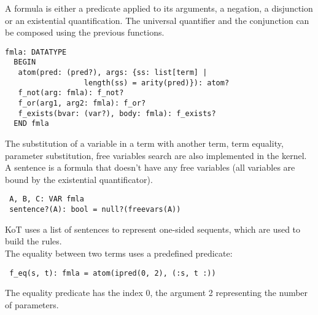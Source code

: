 \documentclass[a4paper,12pt]{article}
\begin{document}
A formula is either a predicate applied to its arguments, a negation, a disjunction or an existential
quantification. The universal quantifier and the conjunction can be composed using the previous functions.

\begin{verbatim}
fmla: DATATYPE
  BEGIN
   atom(pred: (pred?), args: {ss: list[term] | 
			      length(ss) = arity(pred)}): atom?
   f_not(arg: fmla): f_not?
   f_or(arg1, arg2: fmla): f_or?
   f_exists(bvar: (var?), body: fmla): f_exists? 
  END fmla
\end{verbatim} 

The substitution of a variable in a term with another term, term equality, parameter substitution, 
free variables search are also implemented in the kernel. 
A sentence is a formula that doesn't have any free variables (all variables are bound by the existential 
quantificator). 

\begin{verbatim}
 A, B, C: VAR fmla
 sentence?(A): bool = null?(freevars(A))
\end{verbatim}
KoT uses a list of sentences to represent one-sided sequents, which are used to build the rules. \\
The equality between two terms uses a predefined predicate:
\begin{verbatim}
 f_eq(s, t): fmla = atom(ipred(0, 2), (:s, t :))
\end{verbatim}
The equality predicate has the index 0, the argument 2 representing the number of parameters.
\end{document}
